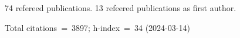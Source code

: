 74 refereed publications. 13 refeered publications as first author.

Total citations~=~3897; h-index~=~34 (2024-03-14)